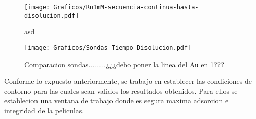 
			\begin{figure}[ht]
				\centering
		 	    \texttt{[image: Graficos/Ru1mM-secuencia-continua-hasta-disolucion.pdf]}
		        \caption[asd]{asd}
		        \label{fig:diso_ru1mM}
		      	\end{figure} 


			\begin{figure}[ht]
				\centering
		 	    \texttt{[image: Graficos/Sondas-Tiempo-Disolucion.pdf]}
		        \caption[AAAAAAaa]{Comparacion sondas.........¿¿¿debo poner la linea del Au en 1???}
		      	\end{figure}

		Conforme lo expuesto anteriormente, se trabajo en establecer las condiciones de contorno para las cuales sean validos los resultados obtenidos. Para ellos se establecion una ventana de trabajo donde es segura maxima adsorcion e integridad de la peliculas.
			

